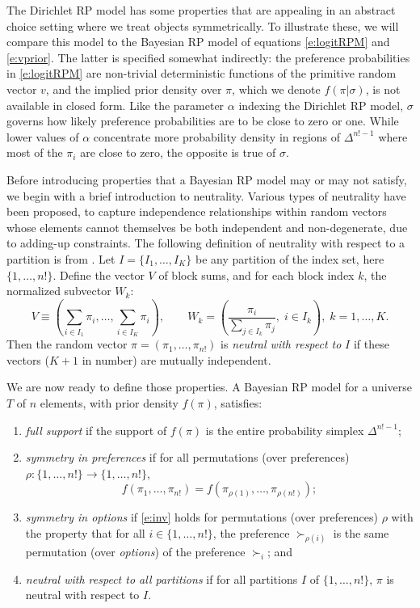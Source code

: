 \documentclass[11pt,letter]{article}
\newcommand{\Dpi}{Dirichlet RP model}
\begin{document}
The \Dpi{} has some properties that are appealing in an abstract choice setting where we treat objects symmetrically.
To illustrate these, we will compare this model to the Bayesian RP model of equations \eqref{e:logitRPM} and \eqref{e:vprior}.
The latter is specified somewhat indirectly: the preference probabilities in \eqref{e:logitRPM} are non-trivial deterministic functions of the primitive random vector $v$, and the implied prior density over $\pi$, which we denote $f(\pi|\sigma)$, is not available in closed form.
Like the parameter $\alpha$ indexing the \Dpi{}, $\sigma$ governs how likely preference probabilities are to be close to zero or one.
While lower values of $\alpha$ concentrate more probability density in regions of $\Delta^{n!-1}$ where most of the $\pi_i$ are close to zero, the opposite is true of $\sigma$.

Before introducing properties that a Bayesian RP model may or may not satisfy, we begin with a brief introduction to neutrality.
Various types of neutrality have been proposed, to capture independence relationships within random vectors whose elements cannot themselves be both independent and non-degenerate, due to adding-up constraints.
The following definition of neutrality with respect to a partition is from .
Let $I=\{I_1,\ldots,I_K\}$ be any partition of the index set, here $\{1,\ldots,n!\}$.
Define the vector $V$ of block sums, and for each block index $k$, the normalized subvector $W_k$:
\[
  V \equiv \left( \sum_{i \in I_1} \pi_i, \ldots, \sum_{i \in I_K} \pi_i \right),
  \qquad W_k = \left(\frac{\pi_i}{\sum_{j \in I_k} \pi_j},\; i \in I_k \right), \; k=1,\ldots,K.
\]
Then the random vector $\pi = (\pi_1,\ldots,\pi_{n!})$ is {\em neutral with respect to} $I$ if these vectors ($K+1$ in number) are mutually independent.

We are now ready to define those properties.
A Bayesian RP model for a universe $T$ of $n$ elements, with prior density $f(\pi)$, satisfies:
\begin{enumerate}
    \item {\em full support} if the support of $f(\pi)$ is the entire probability simplex $\Delta^{n!-1}$;
    \item {\em symmetry in preferences} if for all permutations (over preferences) $\rho \colon \{1,\ldots,n!\} \to \{1,\ldots,n!\}$,
    \begin{equation}\label{e:inv}
      f(\pi_1,\ldots,\pi_{n!}) = f(\pi_{\rho(1)},\ldots,\pi_{\rho(n!)});
    \end{equation}
    \item {\em symmetry in options} if \eqref{e:inv} holds for permutations (over preferences) $\rho$ with the property that for all $i \in \{1,\ldots,n!\}$, the preference $\succ_{\rho(i)}$ is the same permutation (over {\em options}) of the preference $\succ_i$; and
    \item {\em neutral with respect to all partitions} if for all partitions $I$ of $\{1,\ldots,n!\}$, $\pi$ is neutral with respect to $I$.
\end{enumerate}
\end{document}
